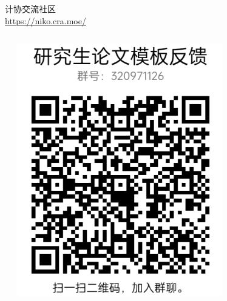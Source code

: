 \documentclass{libs/SUSTech_format}
\begin{document}
{
    \begin{frame}{}
        \centering

        \begin{columns}
            \begin{center}
                \huge{\textbf{}}
            \end{center}

            \begin{center}
                \Large 计协交流社区 \\ \url{https://niko.cra.moe/}
            \end{center}
        \end{columns}

        \vspace{1cm}
        \begin{columns}
            \begin{figure}
                \includegraphics[width=0.8\textwidth]{master-report-qq.jpeg}
            \end{figure}


\end{columns}
\end{frame}}
\end{document}
